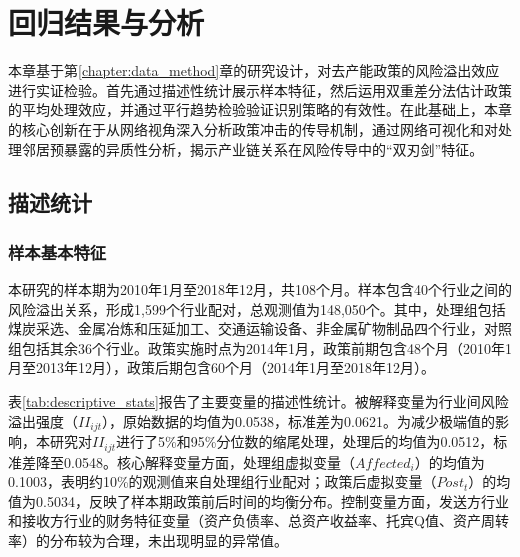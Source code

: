 \chapter{回归结果与分析}
\label{chap:empirical}



本章基于第\ref{chapter:data_method}章的研究设计，对去产能政策的风险溢出效应进行实证检验。首先通过描述性统计展示样本特征，然后运用双重差分法估计政策的平均处理效应，并通过平行趋势检验验证识别策略的有效性。在此基础上，本章的核心创新在于从网络视角深入分析政策冲击的传导机制，通过网络可视化和对处理邻居预暴露的异质性分析，揭示产业链关系在风险传导中的“双刃剑”特征。



\section{描述统计}
\label{sec:descriptive}

\subsection{样本基本特征}

本研究的样本期为2010年1月至2018年12月，共108个月。样本包含40个行业之间的风险溢出关系，形成1,599个行业配对，总观测值为148,050个。其中，处理组包括煤炭采选、金属冶炼和压延加工、交通运输设备、非金属矿物制品四个行业，对照组包括其余36个行业。政策实施时点为2014年1月，政策前期包含48个月（2010年1月至2013年12月），政策后期包含60个月（2014年1月至2018年12月）。

表\ref{tab:descriptive_stats}报告了主要变量的描述性统计。被解释变量为行业间风险溢出强度（$II_{ijt}$），原始数据的均值为0.0538，标准差为0.0621。为减少极端值的影响，本研究对$II_{ijt}$进行了5\%和95\%分位数的缩尾处理，处理后的均值为0.0512，标准差降至0.0548。核心解释变量方面，处理组虚拟变量（$Affected_i$）的均值为0.1003，表明约10\%的观测值来自处理组行业配对；政策后虚拟变量（$Post_t$）的均值为0.5034，反映了样本期政策前后时间的均衡分布。控制变量方面，发送方行业和接收方行业的财务特征变量（资产负债率、总资产收益率、托宾Q值、资产周转率）的分布较为合理，未出现明显的异常值。

